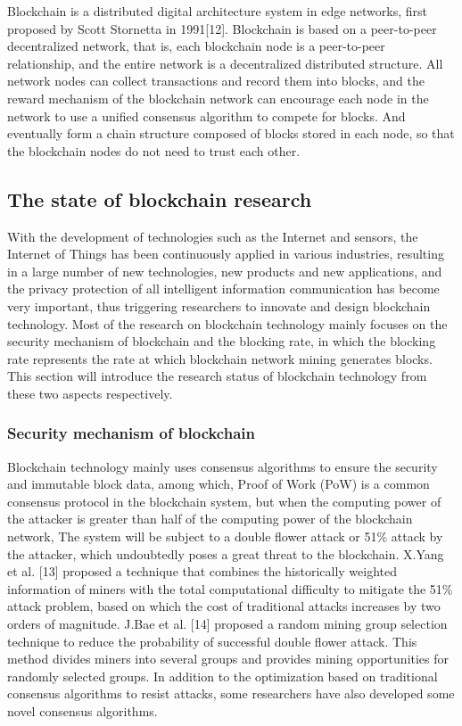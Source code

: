 \documentclass[lettersize,journal]{IEEEtran}
\begin{document}
Blockchain is a distributed digital architecture system in edge networks, first proposed by Scott Stornetta in 1991[12]. Blockchain is based on a peer-to-peer decentralized network, that is, each blockchain node is a peer-to-peer relationship, and the entire network is a decentralized distributed structure. All network nodes can collect transactions and record them into blocks, and the reward mechanism of the blockchain network can encourage each node in the network to use a unified consensus algorithm to compete for blocks. And eventually form a chain structure composed of blocks stored in each node, so that the blockchain nodes do not need to trust each other. 
\subsection{The state of blockchain research}
With the development of technologies such as the Internet and sensors, the Internet of Things has been continuously applied in various industries, resulting in a large number of new technologies, new products and new applications, and the privacy protection of all intelligent information communication has become very important, thus triggering researchers to innovate and design blockchain technology. Most of the research on blockchain technology mainly focuses on the security mechanism of blockchain and the blocking rate, in which the blocking rate represents the rate at which blockchain network mining generates blocks. This section will introduce the research status of blockchain technology from these two aspects respectively.

\subsubsection{Security mechanism of blockchain}
Blockchain technology mainly uses consensus algorithms to ensure the security and immutable block data, among which, Proof of Work (PoW) is a common consensus protocol in the blockchain system, but when the computing power of the attacker is greater than half of the computing power of the blockchain network, The system will be subject to a double flower attack or 51\% attack by the attacker, which undoubtedly poses a great threat to the blockchain. X.Yang et al. [13] proposed a technique that combines the historically weighted information of miners with the total computational difficulty to mitigate the 51\% attack problem, based on which the cost of traditional attacks increases by two orders of magnitude. J.Bae et al. [14] proposed a random mining group selection technique to reduce the probability of successful double flower attack. This method divides miners into several groups and provides mining opportunities for randomly selected groups. In addition to the optimization based on traditional consensus algorithms to resist attacks, some researchers have also developed some novel consensus algorithms. 
\end{document}
